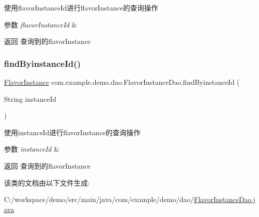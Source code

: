 使用flavor\+Instance\+Id进行flavor\+Instance的查询操作 
\begin{DoxyParams}{参数}
{\em flavor\+Instance\+Id} & \\
\hline
\end{DoxyParams}
\begin{DoxyReturn}{返回}
查询到的flavor\+Instance 
\end{DoxyReturn}
\mbox{\label{interfacecom_1_1example_1_1demo_1_1dao_1_1_flavor_instance_dao_a8eb606bed8739292de9a05bc301aedea}} 
\subsubsection{\texorpdfstring{find\+Byinstance\+Id()}{findByinstanceId()}}
{\footnotesize\ttfamily \mbox{\hyperlink{classcom_1_1example_1_1demo_1_1modular_1_1_flavor_instance}{Flavor\+Instance}} com.\+example.\+demo.\+dao.\+Flavor\+Instance\+Dao.\+find\+Byinstance\+Id (\begin{DoxyParamCaption}\item[{String}]{instance\+Id }\end{DoxyParamCaption})}

使用instance\+Id进行flavor\+Instance的查询操作 
\begin{DoxyParams}{参数}
{\em instance\+Id} & \\
\hline
\end{DoxyParams}
\begin{DoxyReturn}{返回}
查询到的flavor\+Instance 
\end{DoxyReturn}


该类的文档由以下文件生成\+:\begin{DoxyCompactItemize}
\item 
C\+:/workspace/demo/src/main/java/com/example/demo/dao/\mbox{\hyperlink{_flavor_instance_dao_8java}{Flavor\+Instance\+Dao.\+java}}\end{DoxyCompactItemize}
